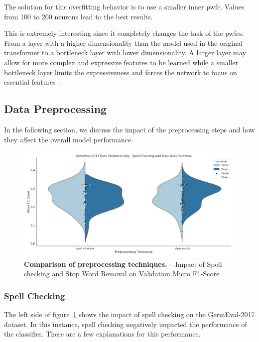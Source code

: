 The solution for this overfitting behavior is to use a smaller inner \gls{pwfc}. Values from 100 to 200 neurons lead to the best results.

This is extremely interesting since it completely changes the task of the \glspl{pwfc}. From a layer with a higher dimensionality than the model used in the original transformer to a bottleneck layer with lower dimensionality. A larger layer may allow for more complex and expressive features to be learned while a smaller bottleneck layer limits the expressiveness and forces the network to focus on essential features~\cite{Ramsundar2015}.

\subsection{Data Preprocessing}
\label{subsec:06_dataPreprocessing}
In the following section, we discuss the impact of the preprocessing steps and how they affect the overall model performance. 

\begin{figure}
    \centering
    \includegraphics[width=\textwidth]{figures/06_results/06_hp_ge_vio_data}
    \caption{\textbf{Comparison of preprocessing techniques.} -- Impact of Spell checking and Stop Word Removal on Validation Micro F1-Score}
    \label{fig:06_PreprocessingHp}
\end{figure}

\subsubsection{Spell Checking}
\label{sec:06_spellChecking}

The left side of figure~\ref{fig:06_PreprocessingHp} shows the impact of spell checking on the GermEval-2017 dataset. In this instance, spell checking negatively impacted the performance of the classifier. There are a few explanations for this performance.
\bigskip

